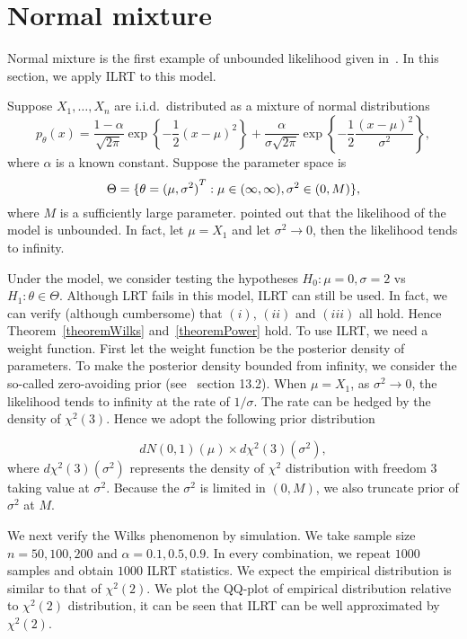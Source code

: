 
\section{Normal mixture}

 Normal mixture is the first example of unbounded likelihood given in~\cite{Cam1990Maximum}. In this section, we apply ILRT to this model.


Suppose $X_1,\ldots,X_n$ are i.i.d.\ distributed as a mixture of normal distributions
\begin{equation}
    p_\theta(x)=\frac{1-\alpha}{\sqrt{2\pi}}\exp\left\{-\frac{1}{2}{(x-\mu)}^2\right\}+
    \frac{\alpha}{\sigma\sqrt{2\pi}}\exp\left\{-\frac{1}{2}\frac{{(x-\mu)}^2}{\sigma^2}\right\},
\end{equation}
 where $\alpha$ is a known constant. Suppose the parameter space is
\begin{equation}
    \Theta=\{\theta={(\mu,\sigma^2)}^T:\mu\in(\-\infty,\infty),\sigma^2\in (0,M)\},
\end{equation}
where $M$ is a sufficiently large parameter.
\cite{Cam1990Maximum} pointed out that the likelihood of the model is unbounded. In fact, let $\mu=X_1$ and let $\sigma^2\to 0$, then the likelihood tends to infinity.

Under the model, we consider testing the hypotheses $H_0:\mu=0,\sigma=2$ vs $H_1:\theta\in
\Theta$. Although LRT fails in this model, ILRT can still be used. In fact, we can verify (although cumbersome) that $(i)$, $(ii)$ and $(iii)$ all hold. Hence Theorem~\ref{theoremWilks} and~\ref{theoremPower} hold. To use ILRT, we need a weight function.
First let the weight function be the posterior density of parameters. To make the posterior density bounded from infinity, we consider the so-called zero-avoiding prior (see~\cite{bayesianDataAnalysis} section 13.2).
When $\mu=X_1$, as $\sigma^2\to 0$, the likelihood tends to infinity at the rate of ${1}/{\sigma}$. The rate can be hedged by the density of $\chi^2(3)$. Hence we adopt the following prior distribution

\begin{equation}
    dN(0,1)(\mu)\times d\chi^2(3)(\sigma^2),
\end{equation}
where $d\chi^2(3)(\sigma^2)$ represents the density of $\chi^2$ distribution with freedom $3$ taking value at $\sigma^2$. Because the $\sigma^2$ is limited in $(0,M)$, we also truncate prior of $\sigma^2$ at $M$.

We next verify the Wilks phenomenon by simulation. We take sample size $n=50,100,200$ and $\alpha=0.1,0.5,0.9$. In every combination, we repeat $1000$ samples and obtain $1000$ ILRT statistics. We expect the empirical distribution is similar to that of $\chi^2(2)$. We plot the QQ-plot of empirical distribution relative to  $\chi^2(2)$ distribution, it can be seen that ILRT can be well approximated by $\chi^2(2)$.

